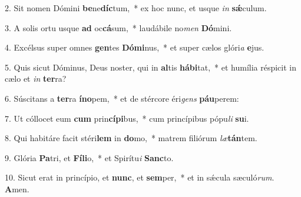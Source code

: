 2. Sit nomen Dómini \textbf{be}ne\textbf{díc}tum,~*  ex hoc nunc, et usque \textit{in} \textbf{sǽ}culum.\

3. A solis ortu usque \textbf{ad} oc\textbf{cá}sum,~*  laudábile no\textit{men} \textbf{Dó}mini.\

4. Excélsus super omnes \textbf{gen}tes \textbf{Dó}\textbf{mi}nus,~*  et super cælos glóri\textit{a} \textbf{e}jus.\

5. Quis sicut Dóminus, Deus noster, qui in \textbf{al}tis \textbf{há}\textbf{bi}tat,~*  et humília réspicit in cælo et \textit{in} \textbf{ter}ra?\

6. Súscitans a \textbf{ter}ra \textbf{ín}\textbf{o}pem,~*  et de stércore éri\textit{gens} \textbf{páu}perem:\

7. Ut cóllocet eum \textbf{cum} prin\textbf{cí}\textbf{pi}bus,~*  cum princípibus pópu\textit{li} \textbf{su}i.\

8. Qui habitáre facit stéri\textbf{lem} in \textbf{do}mo,~*  matrem filiórum \textit{læ}\textbf{tán}tem.\

9. Glória \textbf{Pa}tri, et \textbf{Fí}\textbf{li}o,~*  et Spirítu\textit{i} \textbf{Sanc}to.\

10. Sicut erat in princípio, et \textbf{nunc}, et \textbf{sem}per,~*  et in sǽcula sæculó\textit{rum}. \textbf{A}men.\

